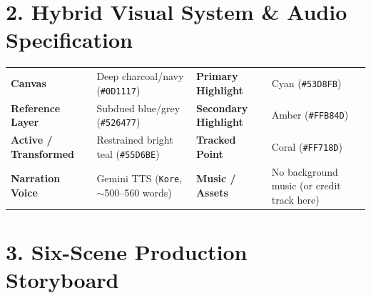 \documentclass[10pt,a4paper]{article}
\begin{document}
\section*{\color{slate}2. Hybrid Visual System \& Audio Specification}
\begin{tabularx}{\textwidth}{@{}l X l X@{}}
\toprule
\textbf{Canvas} & Deep charcoal/navy (\texttt{\#0D1117}) & \textbf{Primary Highlight} & Cyan (\texttt{\#53D8FB}) \\
\textbf{Reference Layer} & Subdued blue/grey (\texttt{\#526477}) & \textbf{Secondary Highlight} & Amber (\texttt{\#FFB84D}) \\
\textbf{Active / Transformed} & Restrained bright teal (\texttt{\#55D6BE}) & \textbf{Tracked Point} & Coral (\texttt{\#FF718D}) \\
\textbf{Narration Voice} & Gemini TTS (\texttt{Kore}, $\sim$500--560 words) & \textbf{Music / Assets} & No background music (or credit track here) \\
\bottomrule
\end{tabularx}

\section*{\color{slate}3. Six-Scene Production Storyboard}
\end{document}
